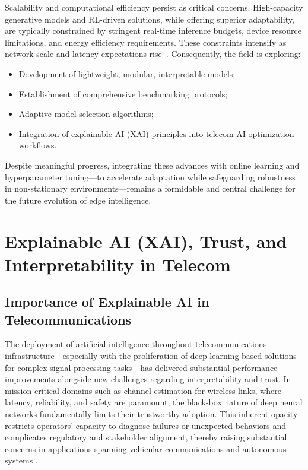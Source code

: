 Scalability and computational efficiency persist as critical concerns. High-capacity generative models and RL-driven solutions, while offering superior adaptability, are typically constrained by stringent real-time inference budgets, device resource limitations, and energy efficiency requirements. These constraints intensify as network scale and latency expectations rise~\cite{ref43,ref44,ref48}. Consequently, the field is exploring:

\begin{itemize}
    \item Development of lightweight, modular, interpretable models;
    \item Establishment of comprehensive benchmarking protocols;
    \item Adaptive model selection algorithms;
    \item Integration of explainable AI (XAI) principles into telecom AI optimization workflows.
\end{itemize}

Despite meaningful progress, integrating these advances with online learning and hyperparameter tuning—to accelerate adaptation while safeguarding robustness in non-stationary environments—remains a formidable and central challenge for the future evolution of edge intelligence.

\section{Explainable AI (XAI), Trust, and Interpretability in Telecom}

\subsection{Importance of Explainable AI in Telecommunications}

The deployment of artificial intelligence throughout telecommunications infrastructure—especially with the proliferation of deep learning-based solutions for complex signal processing tasks—has delivered substantial performance improvements alongside new challenges regarding interpretability and trust. In mission-critical domains such as channel estimation for wireless links, where latency, reliability, and safety are paramount, the black-box nature of deep neural networks fundamentally limits their trustworthy adoption. This inherent opacity restricts operators' capacity to diagnose failures or unexpected behaviors and complicates regulatory and stakeholder alignment, thereby raising substantial concerns in applications spanning vehicular communications and autonomous systems \cite{ref38}\cite{ref41}.

